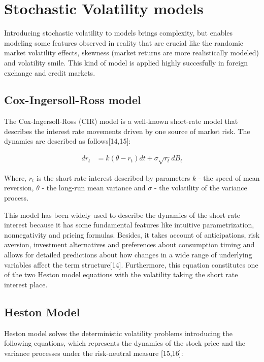 \documentclass[12pt,twoside]{reedthesis}
\theoremstyle{definition}
\theoremstyle{definition}
\theoremstyle{remark}
\begin{document}
  \section{Stochastic Volatility
  models}\label{stochastic-volatility-models}
  
  Introducing stochastic volatility to models brings complexity, but
  enables modeling some features observed in reality that are crucial like
  the randomic market volatility effects, skewness (market returns are
  more realistically modeled) and volatility smile. This kind of model is
  applied highly succesfully in foreign exchange and credit markets.
  
  \subsection{Cox-Ingersoll-Ross model}\label{cox-ingersoll-ross-model}
  
  The Cox-Ingersoll-Ross (CIR) model is a well-known short-rate model that
  describes the interest rate movements driven by one source of market
  risk. The dynamics are described as follows{[}14,15{]}:
  
  \begin{align}
  \label{eq:cir}
  dr_t &= k(\theta - r_t)dt + \sigma \sqrt{r_t} dB_t
  \end{align}
  
  \noindent
  Where, \(r_t\) is the short rate interest described by parameters \(k\)
  - the speed of mean reversion, \(\theta\) - the long-run mean variance
  and \(\sigma\) - the volatility of the variance process.
  
  This model has been widely used to describe the dynamics of the short
  rate interest because it has some fundamental features like intuitive
  parametrization, nonnegativity and pricing formulas. Besides, it takes
  account of anticipations, risk aversion, investment alternatives and
  preferences about consumption timing and allows for detailed predictions
  about how changes in a wide range of underlying variables affect the
  term structure{[}14{]}. Furthermore, this equation constitutes one of
  the two Heston model equations with the volatility taking the short rate
  interest place.
  
  \subsection{Heston Model}\label{heston-model}
  
  Heston model solves the deterministic volatility problems introducing
  the following equations, which represents the dynamics of the stock
  price and the variance processes under the risk-neutral measure
  {[}15,16{]}:
  
\end{document}
